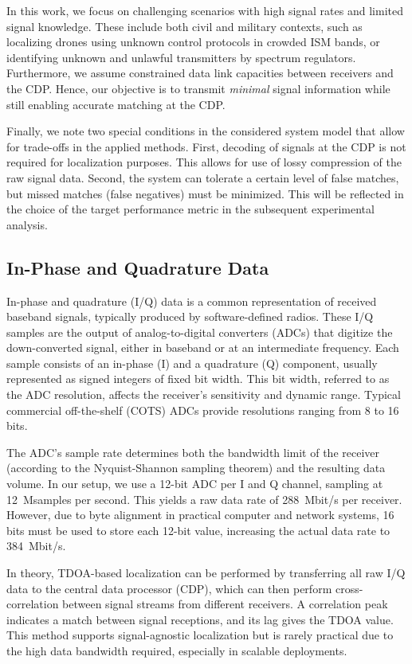\documentclass[sigconf, 10pt, nonacm, anonymous]{acmart}  %
\begin{document}
In this work, we focus on challenging scenarios with high signal rates and limited signal knowledge. These include both civil and military contexts, such as localizing drones using unknown control protocols in crowded ISM bands, or identifying unknown and unlawful transmitters by spectrum regulators. Furthermore, we assume constrained data link capacities between receivers and the CDP. Hence, our objective is to transmit \emph{minimal} signal information while still enabling accurate matching at the CDP.

Finally, we note two special conditions in the considered system model that allow for trade-offs in the applied methods. First, decoding of signals at the CDP is not required for localization purposes. This allows for use of lossy compression of the raw signal data. Second, the system can tolerate a certain level of false matches, but missed matches (false negatives) must be minimized. This will be reflected in the choice of the target performance metric in the subsequent experimental analysis.

\subsection{In-Phase and Quadrature Data}

In-phase and quadrature (I/Q) data is a common representation of received baseband signals, typically produced by software-defined radios. These I/Q samples are the output of analog-to-digital converters (ADCs) that digitize the down-converted signal, either in baseband or at an intermediate frequency. Each sample consists of an in-phase (I) and a quadrature (Q) component, usually represented as signed integers of fixed bit width. This bit width, referred to as the ADC resolution, affects the receiver's sensitivity and dynamic range. Typical commercial off-the-shelf (COTS) ADCs provide resolutions ranging from 8 to 16 bits.

The ADC's sample rate determines both the bandwidth limit of the receiver (according to the Nyquist-Shannon sampling theorem) and the resulting data volume. In our setup, we use a 12-bit ADC per I and Q channel, sampling at 12~Msamples per second. This yields a raw data rate of 288~Mbit/s per receiver. However, due to byte alignment in practical computer and network systems, 16 bits must be used to store each 12-bit value, increasing the actual data rate to 384~Mbit/s.

In theory, TDOA-based localization can be performed by transferring all raw I/Q data to the central data processor (CDP), which can then perform cross-correlation between signal streams from different receivers. A correlation peak indicates a match between signal receptions, and its lag gives the TDOA value. This method supports signal-agnostic localization but is rarely practical due to the high data bandwidth required, especially in scalable deployments.
\end{document}

